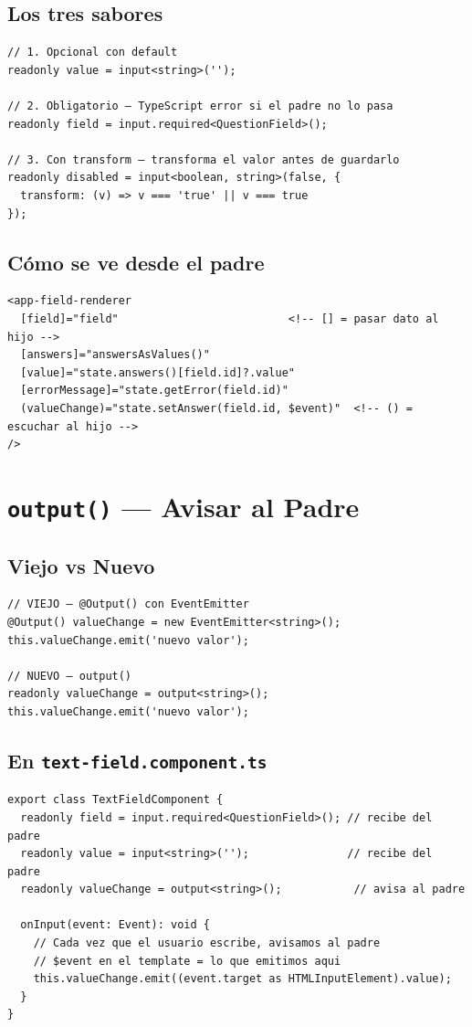 \documentclass[12pt, a4paper]{article}
\begin{document}
\subsection{   Los tres sabores}
\begin{lstlisting}
// 1. Opcional con default
readonly value = input<string>('');

// 2. Obligatorio — TypeScript error si el padre no lo pasa
readonly field = input.required<QuestionField>();

// 3. Con transform — transforma el valor antes de guardarlo
readonly disabled = input<boolean, string>(false, {
  transform: (v) => v === 'true' || v === true
});
\end{lstlisting}

\subsection{ Cómo se ve desde el padre}
\begin{lstlisting}
<app-field-renderer
  [field]="field"                          <!-- [] = pasar dato al hijo -->
  [answers]="answersAsValues()"
  [value]="state.answers()[field.id]?.value"
  [errorMessage]="state.getError(field.id)"
  (valueChange)="state.setAnswer(field.id, $event)"  <!-- () = escuchar al hijo -->
/>
\end{lstlisting}

\section{  \texttt{output()} — Avisar al Padre}

\subsection{  Viejo vs Nuevo}
\begin{lstlisting}
// VIEJO — @Output() con EventEmitter
@Output() valueChange = new EventEmitter<string>();
this.valueChange.emit('nuevo valor');

// NUEVO — output()
readonly valueChange = output<string>();
this.valueChange.emit('nuevo valor');
\end{lstlisting}

\subsection{ En \texttt{text-field.component.ts}}
\begin{lstlisting}
export class TextFieldComponent {
  readonly field = input.required<QuestionField>(); // recibe del padre
  readonly value = input<string>('');               // recibe del padre
  readonly valueChange = output<string>();           // avisa al padre

  onInput(event: Event): void {
    // Cada vez que el usuario escribe, avisamos al padre
    // $event en el template = lo que emitimos aqui
    this.valueChange.emit((event.target as HTMLInputElement).value);
  }
}
\end{lstlisting}
\end{document}
